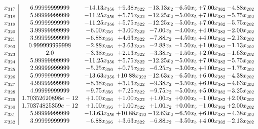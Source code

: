 \documentclass[8pt]{article}
\begin{document}
\[\begin{array}{c| c c@{\hskip 2pt} c@{\hskip 2pt} c@{\hskip 2pt} c@{\hskip 2pt} c@{\hskip 2pt} c@{\hskip 2pt} }
 x_{317}   &  6.99999999999 & -14.13 x_{356} & +  9.38 x_{322} & -13.13 x_{2} & -6.50 x_{5} & +  7.00 x_{382} & -4.88 x_{202}\\
 x_{318}   &  5.99999999999 & -11.25 x_{356} & +  5.75 x_{322} & -12.25 x_{2} & -5.00 x_{5} & +  7.00 x_{382} & -5.75 x_{202}\\
 x_{319}   &  5.99999999999 & -11.25 x_{356} & +  5.75 x_{322} & -12.25 x_{2} & -5.00 x_{5} & +  7.00 x_{382} & -5.75 x_{202}\\
 x_{320}   &  3.99999999999 & -6.00 x_{356} & +  3.00 x_{322} & -7.00 x_{2} & -4.00 x_{5} & +  4.00 x_{382} & -2.00 x_{202}\\
 x_{321}   &  3.99999999999 & -6.88 x_{356} & +  4.63 x_{322} & -7.88 x_{2} & -4.50 x_{5} & +  4.00 x_{382} & -2.13 x_{202}\\
 x_{293}   &  0.999999999998 & -2.88 x_{356} & +  3.63 x_{322} & -2.88 x_{2} & -1.50 x_{5} & +  1.00 x_{382} & -1.13 x_{202}\\
 x_{323}   &  2.0 & -3.38 x_{356} & +  2.13 x_{322} & -3.38 x_{2} & -1.50 x_{5} & +  2.00 x_{382} & -1.63 x_{202}\\
 x_{324}   &  5.99999999999 & -11.25 x_{356} & +  5.75 x_{322} & -12.25 x_{2} & -5.00 x_{5} & +  7.00 x_{382} & -5.75 x_{202}\\
 x_{325}   &  2.99999999999 & -5.25 x_{356} & +  0.75 x_{322} & -6.25 x_{2} & -3.00 x_{5} & +  4.00 x_{382} & -1.75 x_{202}\\
 x_{326}   &  5.99999999999 & -13.63 x_{356} & + 10.88 x_{322} & -12.63 x_{2} & -6.50 x_{5} & +  6.00 x_{382} & -4.38 x_{202}\\
 x_{327}   &  4.99999999999 & -8.38 x_{356} & +  3.13 x_{322} & -9.38 x_{2} & -3.50 x_{5} & +  6.00 x_{382} & -4.63 x_{202}\\
 x_{328}   &  4.99999999999 & -9.75 x_{356} & +  7.25 x_{322} & -9.75 x_{2} & -5.00 x_{5} & +  5.00 x_{382} & -3.25 x_{202}\\
 x_{329}   &  1.70352620898e-12 & +  1.00 x_{356} & +  1.00 x_{322} & +  1.00 x_{2} & +  0.00 x_{5} & -1.00 x_{382} & +  2.00 x_{202}\\
 x_{330}   &  1.70374825359e-12 & +  1.00 x_{356} & +  1.00 x_{322} & +  1.00 x_{2} & +  0.00 x_{5} & -1.00 x_{382} & +  2.00 x_{202}\\
 x_{331}   &  5.99999999999 & -13.63 x_{356} & + 10.88 x_{322} & -12.63 x_{2} & -6.50 x_{5} & +  6.00 x_{382} & -4.38 x_{202}\\
 x_{332}   &  3.99999999999 & -6.88 x_{356} & +  3.63 x_{322} & -6.88 x_{2} & -3.50 x_{5} & +  4.00 x_{382} & -2.13 x_{202}\\

\end{array}\]
\end{document}
